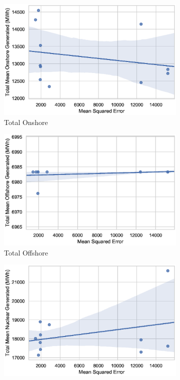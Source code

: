 \begin{figure}
\begin{subfigure}{0.3\textwidth}
		\includegraphics[width=\columnwidth]{Chapter5/figures/market-forecasting/results/elecsim_results/results_2/total_Onshore_mean_output.eps}
		\caption{Total Onshore}
		\label{fig:total_Onshore_mean_output}
	\end{subfigure}
	\medskip
	\begin{subfigure}{0.3\textwidth}   
		\includegraphics[width=\columnwidth]{Chapter5/figures/market-forecasting/results/elecsim_results/results_2/total_Offshore_mean_output.eps}
		\caption{Total Offshore}
		\label{fig:total_Offshore_mean_output}
	\end{subfigure}
	\hfil
	\begin{subfigure}{0.3\textwidth}
		\includegraphics[width=\columnwidth]{Chapter5/figures/market-forecasting/results/elecsim_results/results_2/total_Nuclear_mean_output.eps}

\end{subfigure}
\end{figure}
